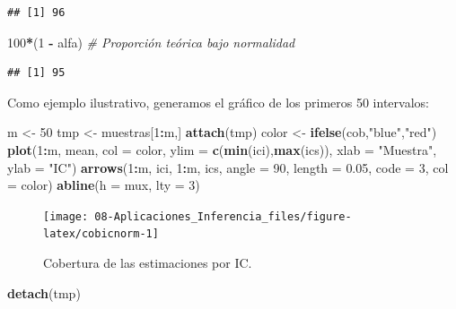 \documentclass[
]{book}
\newenvironment{Shaded}{\begin{snugshade}}{\end{snugshade}}
\newcommand{\CommentTok}[1]{\textcolor[rgb]{0.56,0.35,0.01}{\textit{#1}}}
\newcommand{\DataTypeTok}[1]{\textcolor[rgb]{0.13,0.29,0.53}{#1}}
\newcommand{\DecValTok}[1]{\textcolor[rgb]{0.00,0.00,0.81}{#1}}
\newcommand{\FloatTok}[1]{\textcolor[rgb]{0.00,0.00,0.81}{#1}}
\newcommand{\KeywordTok}[1]{\textcolor[rgb]{0.13,0.29,0.53}{\textbf{#1}}}
\newcommand{\NormalTok}[1]{#1}
\newcommand{\OperatorTok}[1]{\textcolor[rgb]{0.81,0.36,0.00}{\textbf{#1}}}
\newcommand{\StringTok}[1]{\textcolor[rgb]{0.31,0.60,0.02}{#1}}
\theoremstyle{break}
\theoremstyle{definition}
\theoremstyle{definition}
\theoremstyle{definition}
\theoremstyle{remark}
\begin{document}
\begin{enumerate}
\begin{verbatim}
## [1] 96
\end{verbatim}

\begin{Shaded}
\begin{Highlighting}[]
\DecValTok{100}\OperatorTok{*}\NormalTok{(}\DecValTok{1} \OperatorTok{-}\StringTok{ }\NormalTok{alfa)    }\CommentTok{# Proporción teórica bajo normalidad}
\end{Highlighting}
\end{Shaded}

\begin{verbatim}
## [1] 95
\end{verbatim}

  Como ejemplo ilustrativo, generamos el gráfico de los primeros 50 intervalos:

\begin{Shaded}
\begin{Highlighting}[]
\NormalTok{m <-}\StringTok{ }\DecValTok{50}
\NormalTok{tmp <-}\StringTok{ }\NormalTok{muestras[}\DecValTok{1}\OperatorTok{:}\NormalTok{m,]}
\KeywordTok{attach}\NormalTok{(tmp)}
\NormalTok{color <-}\StringTok{ }\KeywordTok{ifelse}\NormalTok{(cob,}\StringTok{"blue"}\NormalTok{,}\StringTok{"red"}\NormalTok{)}
\KeywordTok{plot}\NormalTok{(}\DecValTok{1}\OperatorTok{:}\NormalTok{m, mean, }\DataTypeTok{col =}\NormalTok{ color, }\DataTypeTok{ylim =} \KeywordTok{c}\NormalTok{(}\KeywordTok{min}\NormalTok{(ici),}\KeywordTok{max}\NormalTok{(ics)), }
     \DataTypeTok{xlab =} \StringTok{"Muestra"}\NormalTok{, }\DataTypeTok{ylab =} \StringTok{"IC"}\NormalTok{)}
\KeywordTok{arrows}\NormalTok{(}\DecValTok{1}\OperatorTok{:}\NormalTok{m, ici, }\DecValTok{1}\OperatorTok{:}\NormalTok{m, ics, }\DataTypeTok{angle =} \DecValTok{90}\NormalTok{, }\DataTypeTok{length =} \FloatTok{0.05}\NormalTok{, }\DataTypeTok{code =} \DecValTok{3}\NormalTok{, }\DataTypeTok{col =}\NormalTok{ color)}
\KeywordTok{abline}\NormalTok{(}\DataTypeTok{h =}\NormalTok{ mux, }\DataTypeTok{lty =} \DecValTok{3}\NormalTok{)}
\end{Highlighting}
\end{Shaded}

  \begin{figure}[!htb]

  {\centering \texttt{[image: 08-Aplicaciones\_Inferencia\_files/figure-latex/cobicnorm-1]} 

  }

  \caption{Cobertura de las estimaciones por IC.}\label{fig:cobicnorm}
  \end{figure}

\begin{Shaded}
\begin{Highlighting}[]
\KeywordTok{detach}\NormalTok{(tmp)}
\end{Highlighting}
\end{Shaded}
\end{enumerate}
\end{document}
